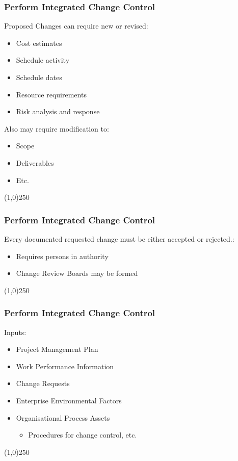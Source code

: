 \begin{frame}
\frametitle{Perform Integrated Change Control}
Proposed Changes can require new or revised:
\begin{itemize}
	\item Cost estimates 
	\item Schedule activity
	\item Schedule dates
	\item Resource requirements
	\item Risk analysis and response
\end{itemize}
Also may require modification to: 
\begin{itemize}
	\item Scope
	\item Deliverables
	\item Etc.
\end{itemize}
\end{frame}\begin{center}\line(1,0){250}\end{center}
%
%

\begin{frame}
\frametitle{Perform Integrated Change Control}
Every documented requested change must be either accepted or rejected.:
\begin{itemize}
	\item Requires persons in authority
	\item Change Review Boards may be formed
\end{itemize}
\end{frame}\begin{center}\line(1,0){250}\end{center}
%
%

\begin{frame}
\frametitle{Perform Integrated Change Control}
Inputs:
\begin{itemize}
	\item Project Management Plan
	\item Work Performance Information
	\item Change Requests
	\item Enterprise Environmental Factors
	\item Organisational Process Assets
		\begin{itemize}
			\item Procedures for change control, etc.
		\end{itemize}
\end{itemize}
\end{frame}\begin{center}\line(1,0){250}\end{center}
%
%

